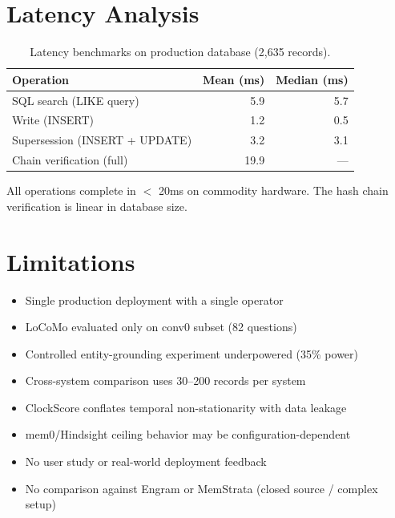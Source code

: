 \documentclass[sigconf,nonacm]{acmart}
\begin{document}
\section{Latency Analysis}
\label{sec:latency}

\begin{table}[h]
\centering
\caption{Latency benchmarks on production database (2{,}635 records).}
\begin{tabular}{lrr}
\toprule
Operation & Mean (ms) & Median (ms) \\
\midrule
SQL search (LIKE query) & 5.9 & 5.7 \\
Write (INSERT) & 1.2 & 0.5 \\
Supersession (INSERT + UPDATE) & 3.2 & 3.1 \\
Chain verification (full) & 19.9 & --- \\
\bottomrule
\end{tabular}
\end{table}

All operations complete in $<$ 20ms on commodity hardware. The hash chain verification is linear in database size.

\section{Limitations}
\label{sec:limitations}

\begin{itemize}
\item Single production deployment with a single operator
\item LoCoMo evaluated only on conv0 subset (82 questions)
\item Controlled entity-grounding experiment underpowered (35\% power)
\item Cross-system comparison uses 30--200 records per system
\item ClockScore conflates temporal non-stationarity with data leakage
\item mem0/Hindsight ceiling behavior may be configuration-dependent
\item No user study or real-world deployment feedback
\item No comparison against Engram or MemStrata (closed source / complex setup)
\end{itemize}
\end{document}
